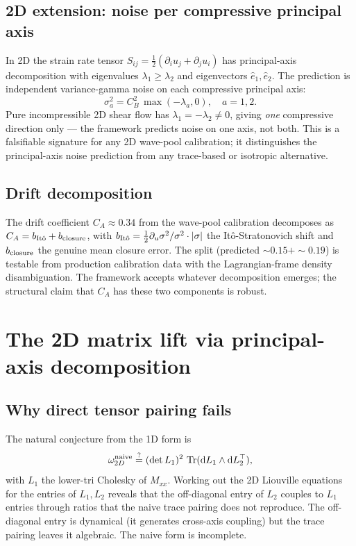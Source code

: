 \documentclass[11pt]{article}
\newcommand{\dd}{\mathrm{d}}
\newcommand{\half}{\tfrac{1}{2}}
\newcommand{\Tr}{\operatorname{Tr}}
\begin{document}
\subsection{2D extension: noise per compressive principal axis}

In 2D the strain rate tensor $S_{ij} = \half(\partial_i u_j +
\partial_j u_i)$ has principal-axis decomposition with eigenvalues
$\lambda_1\geq\lambda_2$ and eigenvectors $\hat e_1,\hat e_2$. The
prediction is independent variance-gamma noise on each compressive
principal axis:
\begin{equation}
  \sigma_a^2 = C_B^2\,\max(-\lambda_a,0),\quad a=1,2.
\end{equation}
Pure incompressible 2D shear flow has $\lambda_1=-\lambda_2\neq 0$,
giving \emph{one} compressive direction only --- the framework predicts
noise on one axis, not both. This is a falsifiable signature for any
2D wave-pool calibration; it distinguishes the principal-axis noise
prediction from any trace-based or isotropic alternative.

\subsection{Drift decomposition}

The drift coefficient $C_A\approx 0.34$ from the wave-pool calibration
decomposes as $C_A = b_{\rm It\hat o} + b_{\rm closure}$, with
$b_{\rm It\hat o} = \half\partial_u\sigma^2/\sigma^2\cdot|\sigma|$
the It\^o-Stratonovich shift and $b_{\rm closure}$ the genuine mean
closure error. The split (predicted $\sim 0.15+\sim 0.19$) is
testable from production calibration data with the Lagrangian-frame
density disambiguation. The framework accepts whatever decomposition
emerges; the structural claim that $C_A$ has these two components is
robust.

\section{The 2D matrix lift via principal-axis decomposition}
\label{sec:matrix-lift}

\subsection{Why direct tensor pairing fails}

The natural conjecture from the 1D form is
\begin{equation}
  \omega_{2D}^{\rm naive}\stackrel{?}{=} (\det L_1)^2\,\Tr(\dd L_1\wedge\dd L_2^\top),
\end{equation}
with $L_1$ the lower-tri Cholesky of $M_{xx}$. Working out the 2D
Liouville equations for the entries of $L_1, L_2$ reveals that the
off-diagonal entry of $L_2$ couples to $L_1$ entries through ratios
that the naive trace pairing does not reproduce. The off-diagonal
entry is dynamical (it generates cross-axis coupling) but the trace
pairing leaves it algebraic. The naive form is incomplete.
\end{document}
